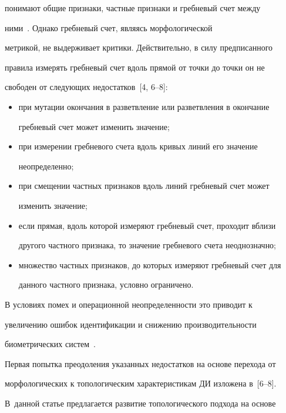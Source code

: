 понимают общие признаки, частные признаки и гребневый счет между 


ними~\cite{4-ush}. Однако гребневый счет, являясь морфологической 


метрикой, не выдерживает критики. Действительно, в силу предписанного 


правила измерять гребневый счет вдоль прямой от точки до точки он не 


свободен от следующих недостатков~[4, 6--8]:


  \begin{itemize}


\item при мутации окончания в разветвление или разветвления в окончание 


гребневый счет может изменить значение;


\item при измерении гребневого счета вдоль кривых линий его значение 


неопределенно;


\item при смещении частных признаков вдоль линий гребневый счет может 


изменить значение;


\item если прямая, вдоль которой измеряют гребневый счет, проходит вблизи 


другого частного признака, то значение гребневого счета неоднозначно;


\item множество частных признаков, до которых измеряют гребневый счет для 


данного частного признака, условно ограничено.


\end{itemize}





  В условиях помех и операционной неопределенности это приводит к 


увеличению ошибок идентификации и снижению производительности 


биометрических систем~\cite{9-ush}.


  


  Первая попытка преодоления указанных недостатков на основе перехода от 


морфологических к топологическим характеристикам ДИ изложена в~[6--8]. 


В~данной статье предлагается развитие топологического подхода на основе 


